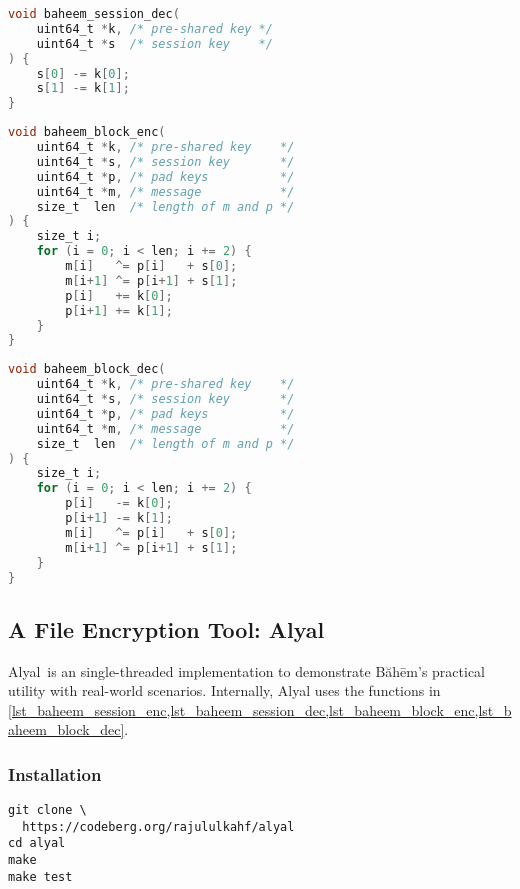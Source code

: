 \documentclass[twocolumn,hidelinks]{article}
\newcommand{\baheem}{Băhēm}
\newcommand{\alyal}{Alyal}
\begin{document}
\begin{lstlisting}[language=C, caption=Session key decryption function
                   example., label=lst_baheem_session_dec]
void baheem_session_dec(
    uint64_t *k, /* pre-shared key */
    uint64_t *s  /* session key    */
) {
    s[0] -= k[0];
    s[1] -= k[1];
}
\end{lstlisting}

\begin{lstlisting}[language=C, caption=Block encryption function example.,
                   label=lst_baheem_block_enc]
void baheem_block_enc(
    uint64_t *k, /* pre-shared key    */
    uint64_t *s, /* session key       */
    uint64_t *p, /* pad keys          */
    uint64_t *m, /* message           */
    size_t  len  /* length of m and p */
) {
    size_t i;
    for (i = 0; i < len; i += 2) {
        m[i]   ^= p[i]   + s[0];
        m[i+1] ^= p[i+1] + s[1];
        p[i]   += k[0];
        p[i+1] += k[1];
    }
}
\end{lstlisting}

\begin{lstlisting}[language=C, caption=Block decryption function example.,
                   label=lst_baheem_block_dec]
void baheem_block_dec(
    uint64_t *k, /* pre-shared key    */
    uint64_t *s, /* session key       */
    uint64_t *p, /* pad keys          */
    uint64_t *m, /* message           */
    size_t  len  /* length of m and p */
) {
    size_t i;
    for (i = 0; i < len; i += 2) {
        p[i]   -= k[0];
        p[i+1] -= k[1];
        m[i]   ^= p[i]   + s[0];
        m[i+1] ^= p[i+1] + s[1];
    }
}
\end{lstlisting}

\subsection{A File Encryption Tool: Alyal}
\alyal\ is an single-threaded implementation to demonstrate \baheem's
practical utility with real-world scenarios.  Internally, Alyal uses the
functions in
\cref{lst_baheem_session_enc,lst_baheem_session_dec,lst_baheem_block_enc,lst_baheem_block_dec}.

\subsubsection{Installation}
\begin{verbatim}
git clone \
  https://codeberg.org/rajululkahf/alyal
cd alyal
make
make test
\end{verbatim}
\end{document}
